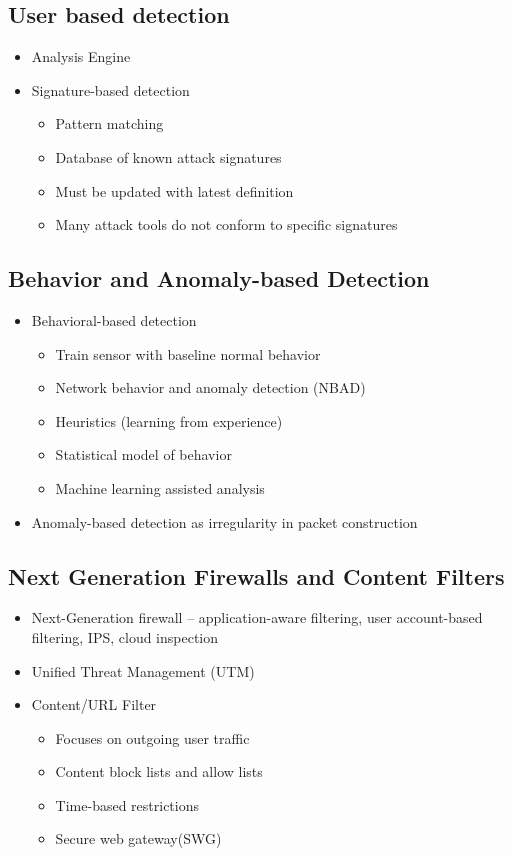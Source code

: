 	\subsection {User based detection}
		\begin{itemize}
			\item Analysis Engine
			\item Signature-based detection
				\begin{itemize}
					\item Pattern matching
					\item Database of known attack signatures
					\item Must be updated with latest definition
					\item Many attack tools do not conform to specific signatures
				\end{itemize}
		\end{itemize}
	\subsection {Behavior and Anomaly-based Detection}
		\begin{itemize}
			\item Behavioral-based detection
				\begin{itemize}
					\item Train sensor with baseline normal behavior
					\item Network behavior and anomaly detection (NBAD)
					\item Heuristics (learning from experience)
					\item Statistical model of behavior
					\item Machine learning assisted analysis
				\end{itemize}
			\item Anomaly-based detection as irregularity in packet construction
		\end{itemize}
	\subsection {Next Generation Firewalls and Content Filters}
		\begin{itemize}
			\item Next-Generation firewall -- application-aware filtering, user
				account-based filtering, IPS, cloud inspection
			\item Unified Threat Management (UTM)
			\item Content/URL Filter
				\begin{itemize}
					\item Focuses on outgoing user traffic
					\item Content block lists and allow lists
					\item Time-based restrictions
					\item Secure web gateway(SWG)
				\end{itemize}
		\end{itemize}
